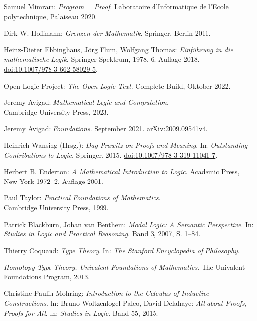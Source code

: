 \begin{thebibliography}{00}
Samuel Mimram:
\emph{\href{https://www.lix.polytechnique.fr/Labo/Samuel.Mimram/publications/}%
{Program = Proof}}.
Laboratoire d'Informatique de l'Ecole polytechnique, Palaiseau 2020.

Dirk W. Hoffmann: \emph{Grenzen der Mathematik}.
Springer, Berlin 2011.

Heinz-Dieter Ebbinghaus, Jörg Flum, Wolfgang Thomas:
\emph{Einführung in die mathematische Logik}.
Springer Spektrum, 1978, 6. Auflage 2018.\\
\href{https://doi.org/10.1007/978-3-662-58029-5}%
{doi:10.1007/978-3-662-58029-5}.

 Open Logic Project:
\emph{The Open Logic Text}. Complete Build, Oktober 2022.

 Jeremy Avigad:
\emph{Mathematical Logic and Computation}.\\
Cambridge University Press, 2023.

 Jeremy Avigad: \emph{Foundations}.
September 2021. \href{https://arxiv.org/abs/2009.09541v4}{arXiv:2009.09541v4}.

 Heinrich Wansing (Hrsg.):
\emph{Dag Prawitz on Proofs and Meaning}.
In: \emph{Outstanding Contributions to Logic}. Springer, 2015.
\href{https://doi.org/10.1007/978-3-319-11041-7}{doi:10.1007/978-3-319-11041-7}.

 Herbert B. Enderton:
\emph{A Mathematical Introduction to Logic}.
Academic Press, New York 1972, 2. Auflage 2001.

 Paul Taylor:
\emph{Practical Foundations of Mathematics}.\\
Cambridge University Press, 1999.

 Patrick Blackburn, Johan van Benthem:
\emph{Modal Logic: A Semantic Perspective}.
In: \emph{Studies in Logic and Practical Reasoning}.
Band 3, 2007, S. 1--84.

 Thierry Coquand:
\emph{Type Theory}. In: \emph{The Stanford Encyclopedia of Philosophy}.

\emph{Homotopy Type Theory. Univalent Foundations of Mathematics}.
The Univalent Foundations Program, 2013.

 Christine Paulin-Mohring:
\emph{Introduction to the Calculus of Inductive Constructions}. In:
Bruno Woltzenlogel Paleo, David Delahaye: \emph{All about Proofs, Proofs for All}.
In: \emph{Studies in Logic}. Band 55, 2015.


\end{thebibliography}
